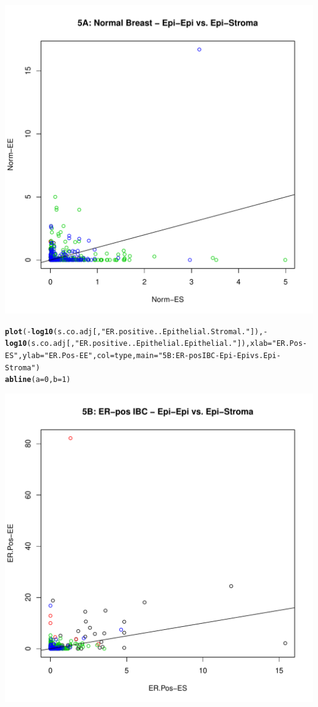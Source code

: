 \documentclass{article}\usepackage[]{graphicx}\usepackage[]{color}
\makeatletter
\def\maxwidth{ %
  \ifdim\Gin@nat@width>\linewidth
    \linewidth
  \else
    \Gin@nat@width
  \fi
}
\newcommand{\hlnum}[1]{\textcolor[rgb]{0.686,0.059,0.569}{#1}}%
\newcommand{\hlstr}[1]{\textcolor[rgb]{0.192,0.494,0.8}{#1}}%
\newcommand{\hlopt}[1]{\textcolor[rgb]{0,0,0}{#1}}%
\newcommand{\hlstd}[1]{\textcolor[rgb]{0.345,0.345,0.345}{#1}}%
\newcommand{\hlkwc}[1]{\textcolor[rgb]{0.333,0.667,0.333}{#1}}%
\newcommand{\hlkwd}[1]{\textcolor[rgb]{0.737,0.353,0.396}{\textbf{#1}}}%
\newenvironment{kframe}{%
 \def\at@end@of@kframe{}%
 \ifinner\ifhmode%
  \def\at@end@of@kframe{\end{minipage}}%
  \begin{minipage}{\columnwidth}%
 \fi\fi%
 \def\FrameCommand##1{\hskip\@totalleftmargin \hskip-\fboxsep
 \colorbox{shadecolor}{##1}\hskip-\fboxsep
     \hskip-\linewidth \hskip-\@totalleftmargin \hskip\columnwidth}%
 \MakeFramed {\advance\hsize-\width
   \@totalleftmargin\z@ \linewidth\hsize
   \@setminipage}}%
 {\par\unskip\endMakeFramed%
 \at@end@of@kframe}
\newenvironment{knitrout}{}{} %
\makeatother
\begin{document}
\begin{knitrout}
\includegraphics[width=\maxwidth]{figure/Figure_4__Analysis_of_SANTA_Results-4} 
\begin{kframe}\begin{alltt}
\hlkwd{plot}\hlstd{(}\hlopt{-}\hlkwd{log10}\hlstd{(s.co.adj[,}\hlstr{"ER.positive..Epithelial.Stromal."} \hlstd{]),}\hlopt{-}\hlkwd{log10}\hlstd{(s.co.adj[,}\hlstr{"ER.positive..Epithelial.Epithelial."}  \hlstd{]),}\hlkwc{xlab}\hlstd{=}\hlstr{"ER.Pos-ES"}\hlstd{,}\hlkwc{ylab}\hlstd{=}\hlstr{"ER.Pos-EE"}\hlstd{,}\hlkwc{col}\hlstd{=type,} \hlkwc{main} \hlstd{=} \hlstr{"5B: ER-pos IBC - Epi-Epi vs. Epi-Stroma"}\hlstd{)}
\hlkwd{abline}\hlstd{(}\hlkwc{a}\hlstd{=}\hlnum{0}\hlstd{,}\hlkwc{b}\hlstd{=}\hlnum{1}\hlstd{)}
\end{alltt}
\end{kframe}
\includegraphics[width=\maxwidth]{figure/Figure_4__Analysis_of_SANTA_Results-5} 

\end{knitrout}
\end{document}

